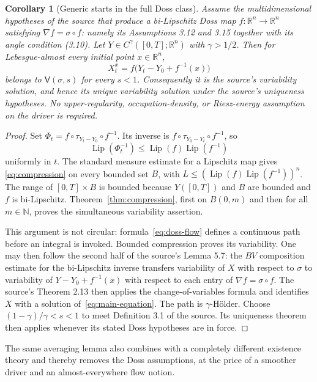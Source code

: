 \documentclass[11pt]{article}
\newtheorem{corollary}{Corollary}
\newcommand{\R}{\mathbb{R}}
\newcommand{\V}{\mathsf{V}}
\begin{document}
\begin{corollary}[Generic starts in the full Doss class]
\label{cor:doss-generic}
Assume the multidimensional hypotheses of the source that produce a
bi-Lipschitz Doss map $f:\R^n\to\R^n$ satisfying
$\nabla f=\sigma\circ f$: namely its Assumptions 3.12 and 3.15 together with
its angle condition (3.10).  Let $Y\in C^\gamma([0,T];\R^n)$ with
$\gamma>1/2$.  Then for Lebesgue-almost every initial point $x\in\R^n$,
\begin{equation}\label{eq:doss-flow}
 X_t^x=f\bigl(Y_t-Y_0+f^{-1}(x)\bigr)
\end{equation}
belongs to $\V(\sigma,s)$ for every $s<1$.  Consequently it is the source's
variability solution, and hence its unique variability solution under the
source's uniqueness hypotheses.  No upper-regularity, occupation-density, or
Riesz-energy assumption on the driver is required.
\end{corollary}

\begin{proof}
Set $\Phi_t=f\circ\tau_{Y_t-Y_0}\circ f^{-1}$.  Its inverse is
$f\circ\tau_{Y_0-Y_t}\circ f^{-1}$, so
\[
 \operatorname{Lip}(\Phi_t^{-1})
 \leq\operatorname{Lip}(f)\operatorname{Lip}(f^{-1})
\]
uniformly in $t$.  The standard measure estimate for a Lipschitz map gives
\eqref{eq:compression} on every bounded set $B$, with
$L\leq(\operatorname{Lip}(f)\operatorname{Lip}(f^{-1}))^n$.  The range of
$[0,T]\times B$ is bounded because $Y([0,T])$ and $B$ are bounded and $f$
is bi-Lipschitz.  Theorem~\ref{thm:compression}, first on $B(0,m)$ and then
for all $m\in\mathbb N$, proves the simultaneous variability assertion.

This argument is not circular: formula~\eqref{eq:doss-flow} defines a
continuous path before an integral is invoked.  Bounded compression proves
its variability.  One may then follow the second half of the source's
Lemma 5.7: the $BV$ composition estimate for the bi-Lipschitz inverse transfers
variability of $X$ with respect to $\sigma$ to variability of
$Y-Y_0+f^{-1}(x)$ with respect to each entry of $\nabla f=\sigma\circ f$.
The source's Theorem 2.13 then applies the change-of-variables formula and
identifies $X$ with a solution of~\eqref{eq:main-equation}.  The path is
$\gamma$-H\"older.  Choose $(1-\gamma)/\gamma<s<1$ to meet Definition 3.1
of the source.  Its uniqueness theorem then applies whenever its stated Doss
hypotheses are in force.
\end{proof}

The same averaging lemma also combines with a completely different existence
theory and thereby removes the Doss assumptions, at the price of a smoother
driver and an almost-everywhere flow notion.
\end{document}
